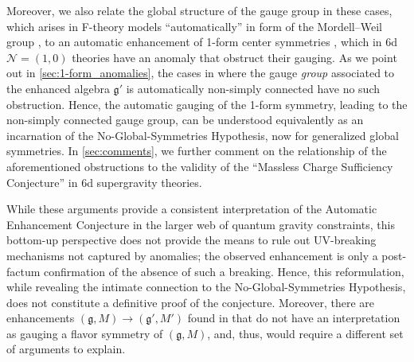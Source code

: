 \documentclass[11pt, a4paper]{article}
\newcommand*{\cN}{\ensuremath{\mathcal{N}}}
\newcommand*{\fkg}{\ensuremath{\mathfrak{g}}}
\begin{document}
Moreover, we also relate the global structure of the gauge group in these cases, which arises in F-theory models ``automatically'' in form of the Mordell--Weil group \cite{Aspinwall:1998xj,Mayrhofer:2014opa,Cvetic:2017epq}, to an automatic enhancement of 1-form center symmetries \cite{Gaiotto:2014kfa}, which in 6d $\cN=(1,0)$ theories have an anomaly \cite{Apruzzi:2020zot} that obstruct their gauging.
As we point out in \cref{sec:1-form_anomalies}, the cases in \cite{Raghuram:2020vxm,Morrison:2021wuv} where the gauge \emph{group} associated to the enhanced algebra $\fkg'$ is automatically non-simply connected have no such obstruction.
Hence, the automatic gauging of the 1-form symmetry, leading to the non-simply connected gauge group, can be understood equivalently as an incarnation of the No-Global-Symmetries Hypothesis, now for generalized global symmetries.
In \cref{sec:comments}, we further comment on the relationship of the aforementioned obstructions to the validity of the ``Massless Charge Sufficiency Conjecture'' \cite{Morrison:2021wuv} in 6d supergravity theories.


While these arguments provide a consistent interpretation of the Automatic Enhancement Conjecture in the larger web of quantum gravity constraints, this bottom-up perspective does not provide the means to rule out UV-breaking mechanisms not captured by anomalies; the observed enhancement is only a post-factum confirmation of the absence of such a breaking.
Hence, this reformulation, while revealing the intimate connection to the No-Global-Symmetries Hypothesis, does not constitute a definitive proof of the conjecture.
Moreover, there are enhancements $(\fkg, M) \to (\fkg',M')$ found in \cite{Raghuram:2020vxm} that do not have an interpretation as gauging a flavor symmetry of $(\fkg, M)$, and, thus, would require a different set of arguments to explain.
\end{document}
